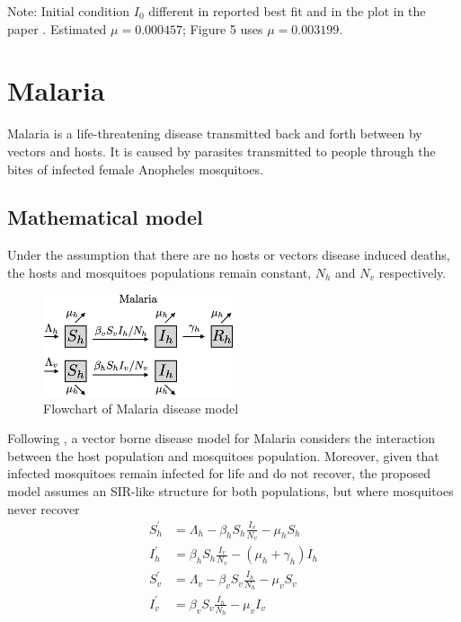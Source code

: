 \documentclass{book}
\begin{document}

Note: Initial condition $I_0$ different in reported best fit and in the plot in the paper \cite{bonyah2017theoretical}.
Estimated $\mu = 0.000457$; Figure 5 uses $\mu = 0.003199$.


\section{Malaria}

Malaria is a life-threatening disease transmitted back and forth between by vectors and hosts.
It is caused by parasites transmitted to people through the bites of infected female Anopheles mosquitoes.

\subsection*{Mathematical model}

Under the assumption that there are no hosts or vectors disease induced deaths, the hosts and mosquitoes populations remain constant, $N_h$ and $N_v$ respectively.
%
\begin{figure}[H]
    \centering
    \includegraphics[width = 0.5\textwidth]{Flowcharts/malaria.png}
    \caption{Flowchart of Malaria disease model}
    \label{fig:malaria_flow}
\end{figure}

Following \cite{brauer2019mathematical}, a vector borne disease model for Malaria considers the interaction between the host population and mosquitoes population. Moreover, given that infected mosquitoes remain infected for life and do not recover, the proposed model assumes an SIR-like structure for both populations, but where mosquitoes never recover
%
\begin{align} 
\label{eq:malaria_model}
\nonumber S_{h}^{\prime}&=\Lambda_{h}-\beta_h S_{h} \frac{I_{v}}{N_{v}}-\mu_{h} S_{h} \\
 I_{h}^{\prime}&=\beta_h S_{h} \frac{I_{v}}{N_{v}}-\left(\mu_{h}+\gamma_{h}\right) I_{h} \\
\nonumber S_{v}^{\prime}&=\Lambda_{v}-\beta_v S_{v} \frac{I_{h}}{N_{h}}-\mu_{v} S_{v} \\
\nonumber I_{v}^{\prime}&=\beta_v S_{v} \frac{I_{h}}{N_{h}}-\mu_{v} I_{v}
\end{align}
%
\end{document}
